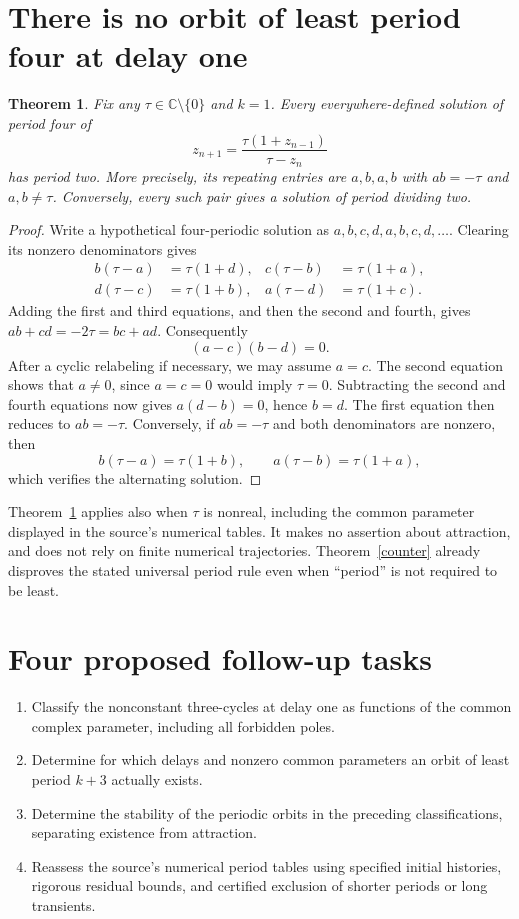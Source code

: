 \documentclass[11pt]{article}
\newtheorem{theorem}{Theorem}
\begin{document}
\section*{There is no orbit of least period four at delay one}
\begin{theorem}\label{four}
Fix any $\tau\in\mathbb C\setminus\{0\}$ and $k=1$. Every
everywhere-defined solution of period four of
\[
 z_{n+1}=\frac{\tau(1+z_{n-1})}{\tau-z_n}
\]
has period two. More precisely, its repeating entries are $a,b,a,b$
with $ab=-\tau$ and $a,b\ne\tau$.
Conversely, every such pair gives a solution of period dividing two.
\end{theorem}
\begin{proof}
Write a hypothetical four-periodic solution as $a,b,c,d,a,b,c,d,\ldots$.
Clearing its nonzero denominators gives
\begin{align*}
b(\tau-a)&=\tau(1+d),&
c(\tau-b)&=\tau(1+a),\\
d(\tau-c)&=\tau(1+b),&
a(\tau-d)&=\tau(1+c).
\end{align*}
Adding the first and third equations, and then the second and fourth,
gives $ab+cd=-2\tau=bc+ad$. Consequently
\[
 (a-c)(b-d)=0.
\]
After a cyclic relabeling if necessary, we may assume $a=c$.
The second equation shows that $a\ne0$, since $a=c=0$ would imply
$\tau=0$. Subtracting the second and fourth equations now gives
$a(d-b)=0$, hence $b=d$. The first equation then reduces to
$ab=-\tau$. Conversely, if $ab=-\tau$ and both denominators are
nonzero, then
\[
 b(\tau-a)=\tau(1+b),\qquad
 a(\tau-b)=\tau(1+a),
\]
which verifies the alternating solution.
\end{proof}

Theorem~\ref{four} applies also when $\tau$ is nonreal, including the
common parameter displayed in the source's numerical tables. It makes
no assertion about attraction, and does not rely on finite numerical
trajectories. Theorem~\ref{counter} already disproves the stated
universal period rule even when ``period'' is not required to be least.

\section*{Four proposed follow-up tasks}
\begin{enumerate}
\item[Task 2.] Classify the nonconstant three-cycles at delay one as
functions of the common complex parameter, including all forbidden poles.
\item[Task 3.] Determine for which delays and nonzero common parameters
an orbit of least period $k+3$ actually exists.
\item[Task 4.] Determine the stability of the periodic orbits in the
preceding classifications, separating existence from attraction.
\item[Task 5.] Reassess the source's numerical period tables using
specified initial histories, rigorous residual bounds, and certified
exclusion of shorter periods or long transients.
\end{enumerate}
\end{document}
